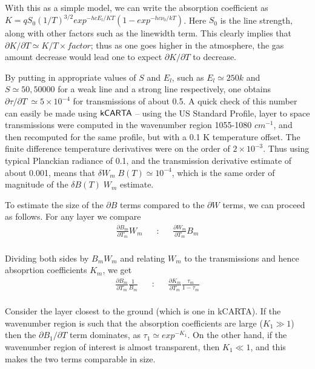 \documentclass[11pt]{article}
\begin{document}
With this as a simple model, we can write the absorption coefficient
as $K = q S_{0} (1/T)^{3/2} exp^{-hcE_{l}/KT} (1-exp^{-hc\nu_{0}/kT}) $. 
Here $S_{0}$ is the line strength, along with other factors such as the 
linewidth term. This clearly implies that $\partial K/\partial T \simeq K/T 
\times factor$; thus as one goes higher in the atmosphere, the gas amount
decrease would lead one to expect $\partial K/\partial T$ to decrease.

By putting in appropriate values of
$S$ and $E_{l}$, such as $E_{l} \simeq 250 k$ and $S \simeq 50,50000$
for a weak line and a strong line respectively, one obtains $\partial
\tau/\partial T ~ \simeq 5 \times 10^{-4}$ for transmissions of about
0.5.  A quick check of this number can easily be made using ${\sf
  kCARTA}$ -- using the US Standard Profile, layer to space
transmissions were computed in the wavenumber region 1055-1080
$cm^{-1}$, and then recomputed for the same profile, but with a 0.1 K
temperature offset. The finite difference temperature derivatives were
on the order of $2 \times 10^{-3}$. Thus using typical Planckian
radiance of 0.1, and the transmission derivative estimate of about
0.001, means that $\delta W_{m} \; B(T) \simeq 10^{-4}$, which is the
same order of magnitude of the $\delta B(T) \; W_{m}$ estimate.

To estimate the size of the $\partial B$ terms compared to the $\partial W$ 
terms, we can proceed as follows. For any layer we compare
\begin{eqnarray*}
\frac{\partial B_{m}}{\partial T_{m}} W_{m} \;\;\;   & :\;\;\;  &
\frac{\partial W_{m}}{\partial T_{m}} B_{m} \\
\end{eqnarray*}

Dividing both sides by $B_{m}W_{m}$ and relating $W_{m}$ to the transmissions
and hence absoprtion coefficients $K_{m}$, we get 
\begin{eqnarray*}
\frac{\partial B_{m}}{\partial T_{m}} \frac{1}{B_{m}} \;\;\;   & : \;\;\;  &
\frac{\partial K_{m}}{\partial T_{m}} \frac{\tau_{m}}{1-\tau_{m}}\\
\end{eqnarray*}

Consider the layer closest to the ground (which is one in \textsf{kCARTA}).
If the wavenumber region is such that the  absorption coefficients are
large ($K_{1} \gg 1$) then the $\partial B_{1}/\partial T$ term dominates, 
as $\tau_{1} \simeq exp^{-K_{1}}$. On the other hand, if the wavenumber 
region of interest is almost transparent, then $K_{1} \ll 1$, and this makes 
the two terms comparable in size.
\end{document}
